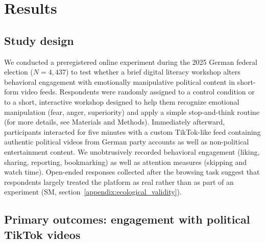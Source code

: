 \documentclass[12pt]{article}
\begin{document}




\section*{Results}

\subsection*{Study design}
We conducted a preregistered online experiment during the 2025 German federal election ($N=4{,}437$) to test whether a brief digital literacy workshop alters behavioral engagement with emotionally manipulative political content in short-form video feeds. Respondents were randomly assigned to a control condition or to a short, interactive workshop designed to help them recognize emotional manipulation (fear, anger, superiority) and apply a simple stop-and-think routine (for more details, see Materials and Methods). Immediately afterward, participants interacted for five minutes with a custom TikTok-like feed containing authentic political videos from German party accounts as well as non-political entertainment content. We unobtrusively recorded behavioral engagement (liking, sharing, reporting, bookmarking) as well as attention measures (skipping and watch time). 
Open-ended responses collected after the browsing task suggest that respondents largely treated the platform as real rather than as part of an experiment (SM, section~\ref{appendix:ecological_validity}).

\subsection*{Primary outcomes: engagement with political TikTok videos}
\end{document}
